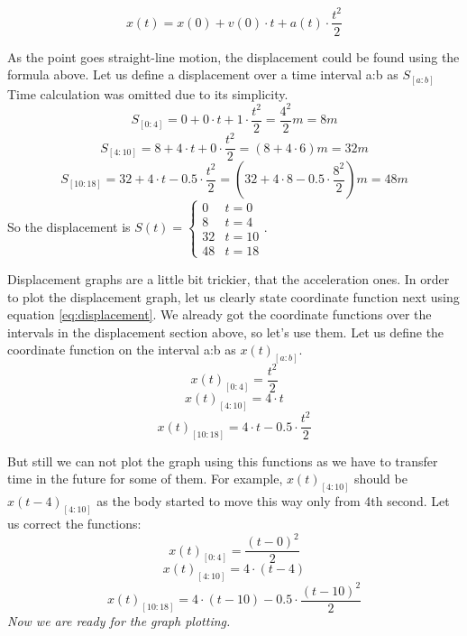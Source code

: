 \documentclass{article}
\begin{document}
\begin{equation}
    \label{eq:displacement}
    x(t) = x(0) + v(0) \cdot t + a(t) \cdot \frac{t^2}{2}
\end{equation}

As the point goes straight-line motion, the displacement could be found using the formula above.
Let us define a displacement over a time interval a:b as $ S_{[a:b]} $
Time calculation was omitted due to its simplicity.
$$ S_{[0:4]} = 0 + 0 \cdot t + 1 \cdot \frac{t^2}{2} = \frac{4^2}{2}m = 8m $$
$$ S_{[4:10]} = 8 + 4 \cdot t + 0 \cdot \frac{t^2}{2} = (8 + 4 \cdot 6)m = 32m $$
$$ S_{[10:18]} = 32 + 4 \cdot t - 0.5 \cdot \frac{t^2}{2} = (32 + 4 \cdot 8 - 0.5 \cdot \frac{8^2}{2})m = 48m $$
So the displacement is $S(t) = \begin{cases} 0 & t = 0 \\ 8 & t = 4 \\ 32 & t = 10 \\ 48 & t = 18 \end{cases}$.

\bigbreak Displacement graphs are a little bit trickier, that the acceleration ones.
In order to plot the displacement graph, let us clearly state coordinate function next using equation \ref{eq:displacement}.
We already got the coordinate functions over the intervals in the displacement section above, so let's use them.
Let us define the coordinate function on the interval a:b as $ x(t)_{[a:b]} $.
$$ x(t)_{[0:4]} = \frac{t^2}{2} $$
$$ x(t)_{[4:10]} = 4 \cdot t $$
$$ x(t)_{[10:18]} = 4 \cdot t - 0.5 \cdot \frac{t^2}{2} $$

But still we can not plot the graph using this functions as we have to transfer time in the future for some of them.
For example, $x(t)_{[4:10]}$ should be $x(t-4)_{[4:10]}$ as the body started to move this way only from 4th second.
Let us correct the functions:
$$ x(t)_{[0:4]} = \frac{(t-0)^2}{2} $$
$$ x(t)_{[4:10]} = 4 \cdot (t-4) $$
$$ x(t)_{[10:18]} = 4 \cdot (t-10) - 0.5 \cdot \frac{(t-10)^2}{2} $$
\bigbreak \centering \textit{Now we are ready for the graph plotting.}
\end{document}
